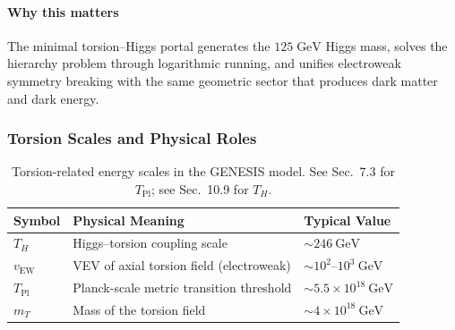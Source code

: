 \documentclass{article}
\begin{document}
\paragraph{Why this matters}
The minimal torsion–Higgs portal
generates the $125\;\text{GeV}$ Higgs mass,
solves the hierarchy problem through logarithmic
running, and unifies electroweak symmetry breaking
with the same geometric sector that produces dark matter
and dark energy.

\medskip
\begin{center}
\end{center}

\subsubsection*{Torsion Scales and Physical Roles}

\vspace{1ex}
\begin{table}[h!]
\centering
\renewcommand{\arraystretch}{1.2}
\begin{tabular}{lll}
\toprule
\textbf{Symbol} & \textbf{Physical Meaning} & \textbf{Typical Value} \\
\midrule
\( T_H \) & Higgs–torsion coupling scale & \( \sim 246\ \mathrm{GeV} \) \\
\( v_{\text{EW}} \) & VEV of axial torsion field (electroweak) & \( \sim 10^2\text{–}10^3\ \mathrm{GeV} \) \\
\( T_{\mathrm{Pl}} \) & Planck-scale metric transition threshold & \( \sim 5.5 \times 10^{18}\ \mathrm{GeV} \) \\
\( m_T \) & Mass of the torsion field & \( \sim 4 \times 10^{18}\ \mathrm{GeV} \) \\
\bottomrule
\end{tabular}
\caption{Torsion-related energy scales in the GENESIS model. See Sec.~7.3 for \( T_{\mathrm{Pl}} \); see Sec.~10.9 for \( T_H \).}
\label{tab:torsion-scales}
\end{table}
\vspace{1ex}
\end{document}
